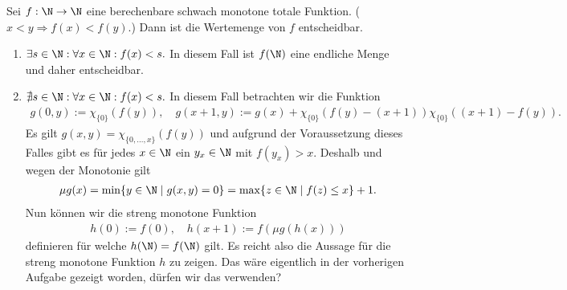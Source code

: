 
\begin{exercise}[215]

\phantom{}

	Sei $f:\N \to \N$ eine berechenbare schwach monotone totale Funktion. ($x < y \Rightarrow f(x) < f(y)$.) Dann ist die Wertemenge von $f$ entscheidbar.

\end{exercise}


\begin{solution}

\phantom{}

	\begin{enumerate}[label = Fall \arabic*:]
		\item $\exists s \in \N: \forall x \in \N: f(x) < s.$ In diesem Fall ist $f(\N)$ eine endliche Menge und daher entscheidbar.
		\item $\nexists s \in \N: \forall x \in \N: f(x) < s.$ In diesem Fall betrachten wir die Funktion
			\begin{align*}
			g(0,y) := \chi_{\{0\}}(f(y)), \quad g(x + 1, y) := g(x) + \chi_{\{0\}}(f(y) - (x + 1)) \chi_{\{0\}}((x + 1) - f(y)).
			\end{align*}
			Es gilt $g(x,y) = \chi_{\{0, \dots, x\}}(f(y))$ und aufgrund der Voraussetzung dieses Falles gibt es für jedes $x \in \N$ ein $y_x \in \N$ mit $f(y_x) > x$. Deshalb und wegen der Monotonie gilt
			\begin{align*}
			\mu g(x) = \min\{y \in \N \mid g(x,y) = 0\} = \max\{z \in \N \mid f(z) \leq x\} + 1.
			\end{align*}
			Nun können wir die streng monotone Funktion
			\begin{align*}
			h(0) := f(0), \quad h(x + 1) := f(\mu g(h(x)))
			\end{align*}
			definieren für welche $h(\N) = f(\N)$ gilt. Es reicht also die Aussage für die streng monotone Funktion $h$ zu zeigen. Das wäre eigentlich in der vorherigen Aufgabe gezeigt worden, dürfen wir das verwenden?
	\end{enumerate}

\end{solution}

